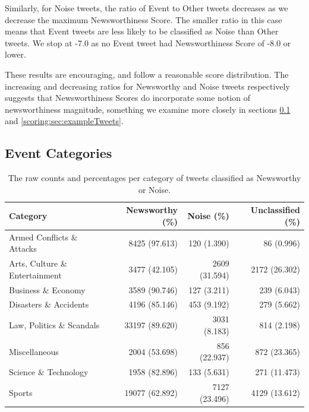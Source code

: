 Similarly, for Noise tweets, the ratio of Event to Other tweets decreases as we decrease the maximum Newsworthiness Score.
The smaller ratio in this case means that Event tweets are less likely to be classified as Noise than Other tweets.
We stop at -7.0 as no Event tweet had Newsworthiness Score of -8.0 or lower.

These results are encouraging, and follow a reasonable score distribution. The increasing and decreasing ratios for Newsworthy and Noise tweets respectively suggests that Newsworthiness Scores do incorporate some notion of newsworthiness magnitude, something we examine more closely in sections \ref{scoring:sec:categories} and \ref{scoring:sec:exampleTweets}.


\subsection{Event Categories}
\label{scoring:sec:categories}

\begin{table}[b!]
	\centering
	\small
	\caption{The raw counts and percentages per category of tweets classified as Newsworthy or Noise.}

	\small
	\begin{tabulary}{\textwidth}{l r r r}
		\toprule
		\textbf{Category} & \textbf{Newsworthy (\%)} & \textbf{Noise (\%)} & \textbf{Unclassified (\%)} \\
		\midrule
		Armed Conflicts \& Attacks 			& 8425 (97.613)  & 120 (1.390)   & 86 (0.996) \\
		Arts, Culture \& Entertainment	& 3477 (42.105)  & 2609 (31.594) & 2172 (26.302) \\
		Business \& Economy 						& 3589 (90.746)  & 127 (3.211)   & 239 (6.043) \\
		Disasters \& Accidents 					& 4196 (85.146)  & 453 (9.192)   & 279 (5.662) \\
		Law, Politics \& Scandals 			& 33197 (89.620) & 3031 (8.183)  & 814 (2.198) \\
		Miscellaneous 									& 2004 (53.698)  & 856 (22.937)  & 872 (23.365) \\
		Science \& Technology 					& 1958 (82.896)  & 133 (5.631)   & 271 (11.473) \\
		Sports 													& 19077 (62.892) & 7127 (23.496) & 4129 (13.612) \\
		\bottomrule
		\end{tabulary}
	\label{scoring:table:categories}
\end{table}

